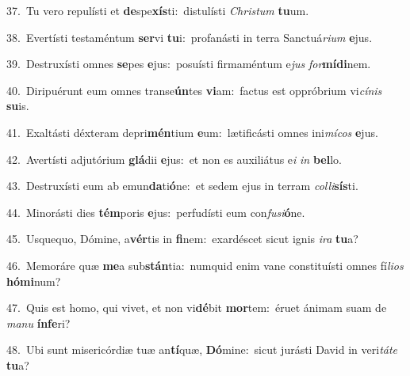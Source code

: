{\numbfont\textcolor{\numbcolor}{37.}}~Tu vero repulísti et \textbf{de}\-spe\-\textbf{xís}\-ti:~\star distulísti \textit{Chris}\-\textit{tum} \textbf{tu}\-um.\par
{\numbfont\textcolor{\numbcolor}{38.}}~Evertísti testaméntum \textbf{ser}\-vi \textbf{tu}\-i:~\star profanásti in terra Sanctuá\-\textit{ri}\-\textit{um} \textbf{e}\-jus.\par
{\numbfont\textcolor{\numbcolor}{39.}}~Destruxísti omnes \textbf{se}\-pes \textbf{e}\-jus:~\star posuísti firmaméntum e\textit{jus} \textit{for}\-\textbf{mí}\textbf{di}nem.\par
{\numbfont\textcolor{\numbcolor}{40.}}~Diripuérunt eum omnes transe\-\textbf{ún}\-tes \textbf{vi}\-am:~\star factus est oppróbrium vi\-\textit{cí}\-\textit{nis} \textbf{su}\-is.\par
{\numbfont\textcolor{\numbcolor}{41.}}~Exaltásti déxteram depri\-\textbf{mén}\-tium \textbf{e}\-um:~\star lætificásti omnes ini\-\textit{mí}\-\textit{cos} \textbf{e}\-jus.\par
{\numbfont\textcolor{\numbcolor}{42.}}~Avertísti adjutórium \textbf{glá}\-dii \textbf{e}\-jus:~\star et non es auxiliátus e\textit{i} \textit{in} \textbf{bel}\-lo.\par
{\numbfont\textcolor{\numbcolor}{43.}}~Destruxísti eum ab emun\-\textbf{da}\-ti\-\textbf{ó}\-ne:~\star et sedem ejus in terram \textit{col}\-\textit{li}\textbf{sís}ti.\par
{\numbfont\textcolor{\numbcolor}{44.}}~Minorásti dies \textbf{tém}\-poris \textbf{e}\-jus:~\star perfudísti eum con\-\textit{fu}\-\textit{si}\textbf{ó}ne.\par
{\numbfont\textcolor{\numbcolor}{45.}}~Usquequo, Dómine, a\-\textbf{vér}\-tis in \textbf{fi}\-nem:~\star exardéscet sicut ignis \textit{i}\-\textit{ra} \textbf{tu}\-a?\par
{\numbfont\textcolor{\numbcolor}{46.}}~Memoráre quæ \textbf{me}\-a sub\-\textbf{stán}\-tia:~\star numquid enim vane constituísti omnes fí\-\textit{li}\-\textit{os} \textbf{hó}\-\textbf{mi}num?\par
{\numbfont\textcolor{\numbcolor}{47.}}~Quis est homo, qui vivet, et non vi\-\textbf{dé}\-bit \textbf{mor}\-tem:~\star éruet ánimam suam de \textit{ma}\-\textit{nu} \textbf{ín}\-\textbf{fe}ri?\par
{\numbfont\textcolor{\numbcolor}{48.}}~Ubi sunt misericórdiæ tuæ an\-\textbf{tí}\-quæ, \textbf{Dó}\-mine:~\star sicut jurásti David in veri\-\textit{tá}\-\textit{te} \textbf{tu}\-a?\par

